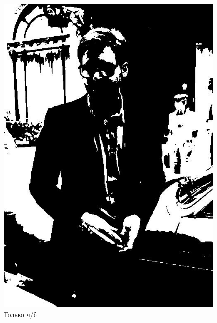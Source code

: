 \documentclass[a4paper,12pt]{article}
\begin{document}
\begin{figure}[h]
\begin{minipage}[h]{0.2\linewidth}
\includegraphics[width=1\linewidth]{Pic_BlackOrWhite}
Только ч/б
\end{minipage}
$\mspace{30mu}$
\begin{minipage}[h]{0.2\linewidth}

\end{minipage}
\end{figure}
\end{document}
